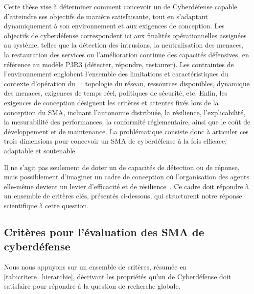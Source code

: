 Cette thèse vise à déterminer comment concevoir un  de Cyberdéfense capable d’atteindre ses objectifs de manière satisfaisante, tout en s’adaptant dynamiquement à son environnement et aux exigences de conception. Les objectifs de cyberdéfense correspondent ici aux finalités opérationnelles assignées au système, telles que la détection des intrusions, la neutralisation des menaces, la restauration des services ou l’amélioration continue des capacités défensives, en référence au modèle P3R3 (détecter, répondre, restaurer). Les contraintes de l’environnement englobent l’ensemble des limitations et caractéristiques du contexte d’opération du ~: topologie du réseau, ressources disponibles, dynamique des menaces, exigences de temps réel, politiques de sécurité, etc. Enfin, les exigences de conception désignent les critères et attentes fixés lors de la conception du SMA, incluant l’autonomie distribuée, la résilience, l’explicabilité, la mesurabilité des performances, la conformité réglementaire, ainsi que le coût de développement et de maintenance. La problématique consiste donc à articuler ces trois dimensions pour concevoir un SMA de cyberdéfense à la fois efficace, adaptable et soutenable.

\medskip

\noindent
Il ne s'agit pas seulement de doter un  de capacités de détection ou de réponse, mais possiblement d'imaginer un cadre de conception où l'organisation des agents elle-même devient un levier d'efficacité et de résilience~\cite{Picard2006, DiMarzoSerugendo2006}. Ce cadre doit répondre à un ensemble de critères clés, présentés ci-dessous, qui structurent notre réponse scientifique à cette question.

\subsection*{Critères pour l’évaluation des SMA de cyberdéfense}

%         

Nous nous appuyons sur un ensemble de critères, résumée en \autoref{tab:critere_hierarchie}, décrivant les propriétés qu’un  de Cyberdéfense doit satisfaire pour répondre à la question de recherche globale.

